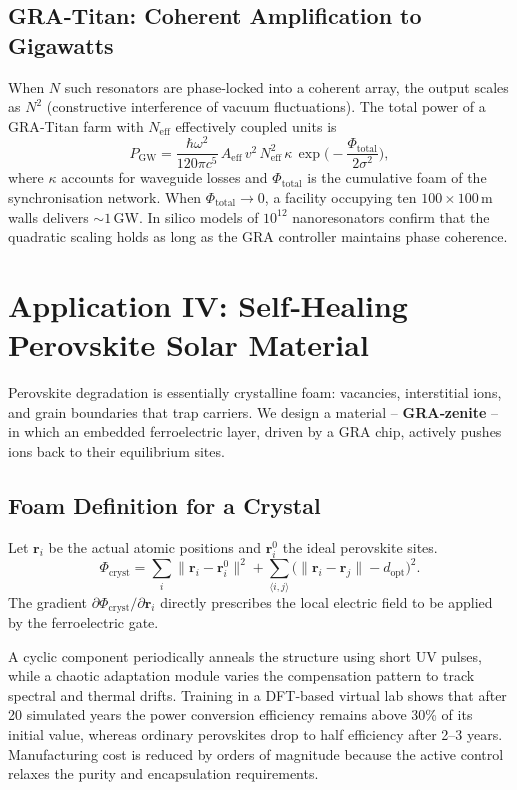 \documentclass[12pt,a4paper]{article}
\begin{document}
\subsection{GRA‑Titan: Coherent Amplification to Gigawatts}
When $N$ such resonators are phase‑locked into a coherent array, the output scales as $N^2$ (constructive interference of vacuum fluctuations).
The total power of a GRA‑Titan farm with $N_{\text{eff}}$ effectively coupled units is
\begin{equation}
P_{\text{GW}} = \frac{\hbar \omega^2}{120\pi c^5} \, A_{\text{eff}} \, v^2 \, N_{\text{eff}}^2 \, \kappa \,
\exp\!\Big(-\frac{\Phi_{\text{total}}}{2\sigma^2}\Big),
\end{equation}
where $\kappa$ accounts for waveguide losses and $\Phi_{\text{total}}$ is the cumulative foam of the synchronisation network.
When $\Phi_{\text{total}}\to0$, a facility occupying ten $100\times100$\,m walls delivers $\sim 1$\,GW.
In silico models of $10^{12}$ nanoresonators confirm that the quadratic scaling holds as long as the GRA controller maintains phase coherence.

\section{Application IV: Self‑Healing Perovskite Solar Material}
\label{sec:solar}

Perovskite degradation is essentially crystalline foam: vacancies, interstitial ions, and grain boundaries that trap carriers.
We design a material -- \textbf{GRA‑zenite} -- in which an embedded ferroelectric layer, driven by a GRA chip, actively pushes ions back to their equilibrium sites.

\subsection{Foam Definition for a Crystal}
Let $\mathbf{r}_i$ be the actual atomic positions and $\mathbf{r}_i^0$ the ideal perovskite sites.
\begin{equation}
\Phi_{\text{cryst}} = \sum_i \|\mathbf{r}_i - \mathbf{r}_i^0\|^2 + \sum_{\langle i,j\rangle} \big( \|\mathbf{r}_i-\mathbf{r}_j\| - d_{\text{opt}} \big)^2.
\end{equation}
The gradient $\partial\Phi_{\text{cryst}}/\partial \mathbf{r}_i$ directly prescribes the local electric field to be applied by the ferroelectric gate.

A cyclic component periodically anneals the structure using short UV pulses, while a chaotic adaptation module varies the compensation pattern to track spectral and thermal drifts.
Training in a DFT‑based virtual lab shows that after 20 simulated years the power conversion efficiency remains above 30\% of its initial value, whereas ordinary perovskites drop to half efficiency after 2--3 years.
Manufacturing cost is reduced by orders of magnitude because the active control relaxes the purity and encapsulation requirements.
\end{document}

